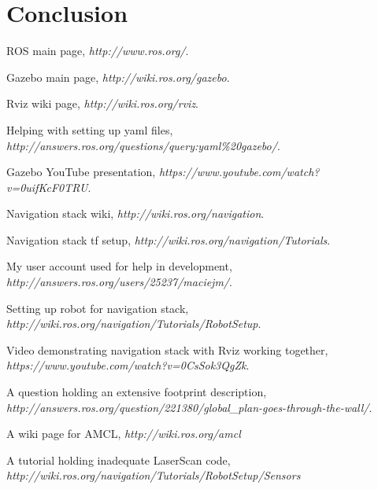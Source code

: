 \documentclass{report}
\begin{document}
  \chapter{Conclusion}
  \begin{thebibliography}{9}

      ROS main page, 
      \emph{http://www.ros.org/}.

      Gazebo main page, 
      \emph{http://wiki.ros.org/gazebo}.

      Rviz wiki page, 
      \emph{http://wiki.ros.org/rviz}.

      Helping with setting up yaml files, 
      \emph{http://answers.ros.org/questions/query:yaml\%20gazebo/}.

      Gazebo YouTube presentation, 
      \emph{https://www.youtube.com/watch?v=0uifKcF0TRU}.


      Navigation stack wiki, 
      \emph{http://wiki.ros.org/navigation}.

      Navigation stack tf setup, 
      \emph{http://wiki.ros.org/navigation/Tutorials}.

      My user account used for help in development, 
      \emph{http://answers.ros.org/users/25237/maciejm/}.

      Setting up robot for navigation stack, 
      \emph{http://wiki.ros.org/navigation/Tutorials/RobotSetup}.

      Video demonstrating navigation stack with Rviz working together, 
      \emph{https://www.youtube.com/watch?v=0CsSok3QgZk}.

      A question holding an extensive footprint description, 
      \emph{http://answers.ros.org/question/221380/global\_plan-goes-through-the-wall/}.

      A wiki page for AMCL,
      \emph{http://wiki.ros.org/amcl}

      A tutorial holding inadequate LaserScan code,
      \emph{http://wiki.ros.org/navigation/Tutorials/RobotSetup/Sensors}



      

  \end{thebibliography}
\end{document}
